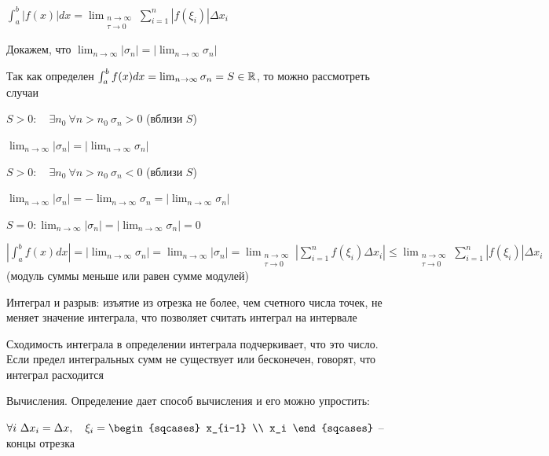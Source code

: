 \documentclass[12pt]{article}
\begin{document}
\begin{enumerate}
\begin{MyProof}
            $\int^b_a |f(x)|dx = \lim_{\substack{n\to\infty \\ \tau\to0}} \sum_{i=1}^n |f(\xi_i)| \Delta x_i$

            Докажем, что $\lim_{n\to\infty} |\sigma_n| = |\lim_{n\to\infty} \sigma_n|$

            Так как определен $\int^b_a f(x)dx = \lim_{n\to\infty} \sigma_n = S \in \mathbb{R}$, то можно рассмотреть случаи

            $S > 0: \quad \exists n_0 \ \forall n > n_0 \ \sigma_n > 0$ (вблизи $S$)

            $\lim_{n\to\infty} |\sigma_n| = |\lim_{n\to\infty} \sigma_n|$

            $S > 0: \quad \exists n_0 \ \forall n > n_0 \ \sigma_n < 0$ (вблизи $S$)

            $\lim_{n\to\infty} |\sigma_n| = -\lim_{n\to\infty} \sigma_n = |\lim_{n\to\infty} \sigma_n|$

            $S = 0: \lim_{n\to\infty} |\sigma_n| = |\lim_{n\to\infty} \sigma_n| = 0$

            $\left| \int^b_a f(x)dx \right| = \left|\lim_{n\to\infty} \sigma_n\right| = \lim_{n\to\infty} |\sigma_n| =
            \lim_{\substack{n\to\infty \\ \tau\to0}} \left|\sum_{i=1}^n f(\xi_i) \Delta x_i\right| \leq \lim_{\substack{n\to\infty \\ \tau\to0}} \sum_{i=1}^n |f(\xi_i)| \Delta x_i$
            (модуль суммы меньше или равен сумме модулей)
        \end{MyProof}

    \end{enumerate}

    \Nota Интеграл и разрыв: изъятие из отрезка не более, чем счетного числа точек, не меняет значение интеграла, что позволяет считать интеграл на интервале

    \Nota Сходимость интеграла в определении интеграла подчеркивает, что это число.
    Если предел интегральных сумм не существует или бесконечен, говорят, что интеграл расходится

    \Nota Вычисления. Определение дает способ вычисления и его можно упростить:

    $\forall i\ \Delta x_i = \Delta x, \quad \xi_i = \begin{sqcases}
                                                         x_{i-1} \\ x_i
    \end{sqcases}$ -- концы отрезка
\end{document}
